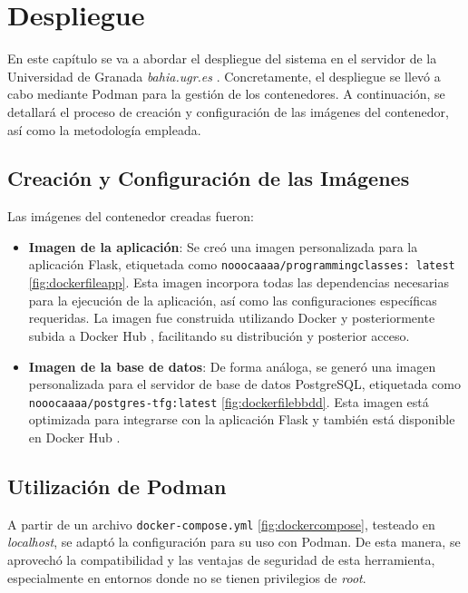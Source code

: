 \chapter{Despliegue} \label{chap:despliegue}

En este capítulo se va a abordar el despliegue del sistema en el servidor de la Universidad de Granada \textit{bahia.ugr.es} \cite{bahia}. Concretamente, el despliegue se llevó a cabo mediante Podman \cite{podman} para la gestión de los contenedores. A continuación, se detallará el proceso de creación y configuración de las imágenes del contenedor, así como la metodología empleada.

\section{Creación y Configuración de las Imágenes}

Las imágenes del contenedor creadas fueron:

\begin{itemize}
    \item \textbf{Imagen de la aplicación}: Se creó una imagen personalizada para la aplicación Flask, etiquetada como \texttt{nooocaaaa/programmingclasses: latest} \ref{fig:dockerfileapp}. Esta imagen incorpora todas las dependencias necesarias para la ejecución de la aplicación, así como las configuraciones específicas requeridas. La imagen fue construida utilizando Docker y posteriormente subida a Docker Hub \cite{dockerhub}, facilitando su distribución y posterior acceso. 
    \item \textbf{Imagen de la base de datos}:  De forma análoga, se generó una imagen personalizada para el servidor de base de datos PostgreSQL, etiquetada como \texttt{nooocaaaa/postgres-tfg:latest} \ref{fig:dockerfilebbdd}. Esta imagen está optimizada para integrarse con la aplicación Flask y también está disponible en Docker Hub \cite{dockerhub2}.
\end{itemize}

\section{Utilización de Podman}

A partir de un archivo \texttt{docker-compose.yml} \ref{fig:dockercompose}, testeado en \textit{localhost}, se adaptó la configuración para su uso con Podman. De esta manera, se aprovechó la compatibilidad y las ventajas de seguridad de esta herramienta, especialmente en entornos donde no se tienen privilegios de \textit{root}.

